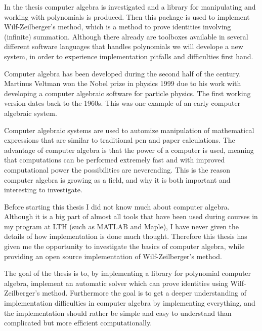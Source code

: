 In the thesis computer algebra is investigated and a library for manipulating and working with polynomials is produced. Then this package is used to implement Wilf-Zeilberger's method, which is a method to prove identities involving (infinite) summation. Although there already are toolboxes available in several different software languages that handles polynomials we will develope a new system, in order to experience implementation pitfalls and difficulties first hand.

Computer algebra has been developed during the second half of the  century. Martinus Veltman won the Nobel prize in physics 1999 due to his work with developing a computer algebraic software for particle physics. The first working version dates back to the 1960s.  This was one example of an early computer algebraic system.

Computer algebraic systems are used to automize manipulation of mathematical expressions that are similar to traditional pen and paper calculations. The advantage of computer algebra is that the power of a computer is used, meaning that computations can be performed extremely fast and with improved computational power the possibilities are neverending. This is the reason computer algebra is growing as a field, and why it is both important and interesting to investigate.

Before starting this thesis I did not know much about computer algebra. Although it is a big part of almost all tools that have been used during courses in my program at LTH (such as MATLAB and Maple), I have never given the details of how implementation is done much thought. Therefore this thesis has given me the opportunity to investigate the basics of computer algebra, while providing an open source implementation of Wilf-Zeilberger's method.

The goal of the thesis is to, by implementing a library for polynomial computer algebra, implement an automatic solver which can prove identities using Wilf-Zeilberger's method. Furthermore the goal is to get a deeper understanding of implementation difficulties in computer algebra by implementing everything, and the implementation should rather be simple and easy to understand than complicated but more efficient computationally.
